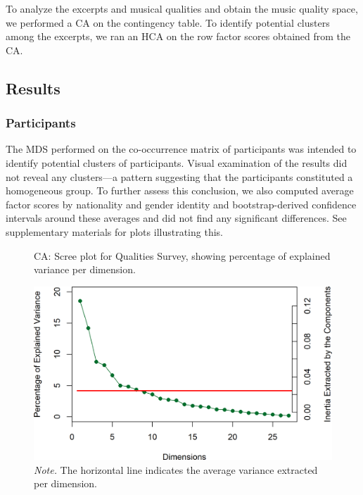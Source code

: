 \documentclass[
  english,
  man,floatsintext]{apa6}
\begin{document}
To analyze the excerpts and musical qualities and obtain the music quality space, we performed a CA on the contingency table. To identify potential clusters among the excerpts, we ran an HCA on the row factor scores obtained from the CA.

\hypertarget{results}{%
\subsection{Results}\label{results}}

\hypertarget{participants-1}{%
\subsubsection{Participants}\label{participants-1}}

The MDS performed on the co-occurrence matrix of participants was intended to identify potential clusters of participants. Visual examination of the results did not reveal any clusters---a pattern suggesting that the participants constituted a homogeneous group. To further assess this conclusion, we also computed average factor scores by nationality and gender identity and bootstrap-derived confidence intervals around these averages and did not find any significant differences. See supplementary materials for plots illustrating this.

\begin{figure}  
  \begin{center}
  \caption{CA: Scree plot for Qualities Survey, showing percentage of explained variance per dimension.}
    \includegraphics{./Music-Descriptor-Space_files/figure-latex/scree4excerptsq-1.png}
  \caption*{\footnotesize \textit{Note.} The horizontal line indicates the average variance extracted per dimension. }\label{fig:scree4excerptsq}  
 \end{center}
\end{figure}
\end{document}
